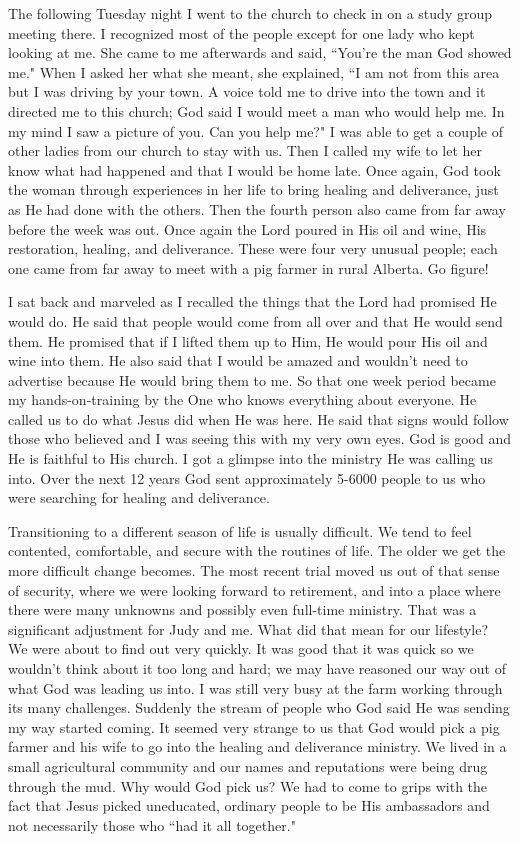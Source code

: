 \documentclass[oneside,12pt]{book}
\begin{document}
The following Tuesday night I went to the church to check in on a study group meeting there. I recognized most of the people except for one lady who kept looking at me. She came to me afterwards and said, ``You're the man God showed me." When I asked her what she meant, she explained, ``I am not from this area but I was driving by your town. A voice told me to drive into the town and it directed me to this church; God said I would meet a man who would help me. In my mind I saw a picture of you. Can you help me?"  I was able to get a couple of other ladies from our church to stay with us. Then I called my wife to let her know what had happened and that I would be home late. Once again, God took the woman through experiences in her life to bring healing and deliverance, just as He had done with the others. Then the fourth person also came from far away before the week was out. Once again the Lord poured in His oil and wine, His restoration, healing, and deliverance. These were four very unusual people; each one came from far away to meet with a pig farmer in rural Alberta. Go figure!

I sat back and marveled as I recalled the things that the Lord had promised He would do. He said that people would come from all over and that He would send them. He promised that if I lifted them up to Him, He would pour His oil and wine into them. He also said that I would be amazed and wouldn't need to advertise because He would bring them to me. So that one week period became my hands-on-training by the One who knows everything about everyone. He called us to do what Jesus did when He was here. He said that signs would follow those who believed and I was seeing this with my very own eyes. God is good and He is faithful to His church. I got a glimpse into the ministry He was calling us into. Over the next 12 years God sent approximately 5-6000 people to us who were searching for healing and deliverance. 

Transitioning to a different season of life is usually difficult. We tend to feel contented, comfortable, and secure with the routines of life. The older we get the more difficult change becomes. The most recent trial moved us out of that sense of security, where we were looking forward to retirement, and into a place where there were many unknowns and possibly even full-time ministry. That was a significant adjustment for Judy and me. What did that mean for our lifestyle? We were about to find out very quickly. It was good that it was quick so we wouldn't think about it too long and hard; we may have reasoned our way out of what God was leading us into. I was still very busy at the farm working through its many challenges. Suddenly the stream of people who God said He was sending my way started coming. It seemed very strange to us that God would pick a pig farmer and his wife to go into the healing and deliverance ministry. We lived in a small agricultural community and our names and reputations were being drug through the mud. Why would God pick us? We had to come to grips with the fact that Jesus picked uneducated, ordinary people to be His ambassadors and not necessarily those who ``had it all together." 
\end{document}
